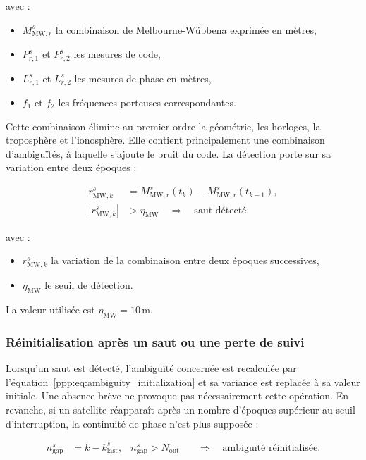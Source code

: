 avec :

\begin{itemize}
    \item $M_{\mathrm{MW},r}^s$ la combinaison de Melbourne-Wübbena exprimée
    en mètres,
    \item $P_{r,1}^s$ et $P_{r,2}^s$ les mesures de code,
    \item $L_{r,1}^s$ et $L_{r,2}^s$ les mesures de phase en mètres,
    \item $f_1$ et $f_2$ les fréquences porteuses correspondantes.
\end{itemize}

Cette combinaison élimine au premier ordre la géométrie, les horloges, la
troposphère et l'ionosphère. Elle contient principalement une combinaison
d'ambiguïtés, à laquelle s'ajoute le bruit du code. La détection porte sur sa
variation entre deux époques :

\begin{align}
r_{\mathrm{MW},k}^s
&=
M_{\mathrm{MW},r}^s(t_k)-M_{\mathrm{MW},r}^s(t_{k-1}),
\\
\left|r_{\mathrm{MW},k}^s\right|
&>\eta_{\mathrm{MW}}
\quad\Longrightarrow\quad
\text{saut détecté}.
\label{ppp:eq:melbourne_wubbena_detection}
\end{align}

avec :

\begin{itemize}
    \item $r_{\mathrm{MW},k}^s$ la variation de la combinaison entre deux
    époques successives,
    \item $\eta_{\mathrm{MW}}$ le seuil de détection.
\end{itemize}

La valeur utilisée est $\eta_{\mathrm{MW}}=10\,\mathrm{m}$.

\subsubsection{Réinitialisation après un saut ou une perte de suivi}

Lorsqu'un saut est détecté, l'ambiguïté concernée est recalculée par
l'équation~\eqref{ppp:eq:ambiguity_initialization} et sa variance est replacée à sa
valeur initiale. Une absence brève ne provoque pas nécessairement cette
opération. En revanche, si un satellite réapparaît après un nombre d'époques
supérieur au seuil d'interruption, la continuité de phase n'est plus supposée :

\begin{align}
n_{\mathrm{gap}}^s
&=
k-k_{\mathrm{last}}^s,
&
n_{\mathrm{gap}}^s>N_{\mathrm{out}}
&\quad\Longrightarrow\quad
\text{ambiguïté réinitialisée}.
\label{ppp:eq:outage_reset}
\end{align}

